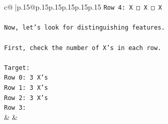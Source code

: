 \documentclass{article}
\begin{document}
{\begin{supertabular}{c@{$\;$}|p{.15\linewidth}@{}p{.15\linewidth}p{.15\linewidth}p{.15\linewidth}p{.15\linewidth}p{.15\linewidth}}
{{{\texttt{Row 4: X □ X □ X  } \\
\\ 
\texttt{Now, let's look for distinguishing features.} \\
\\ 
\texttt{First, check the number of X's in each row.} \\
\\ 
\texttt{Target:} \\
\texttt{Row 0: 3 X's} \\
\texttt{Row 1: 3 X's} \\
\texttt{Row 2: 3 X's} \\
\texttt{Row 3:} \\
            }
        }
    }
    & & \\ \\


\end{supertabular}}
\end{document}
